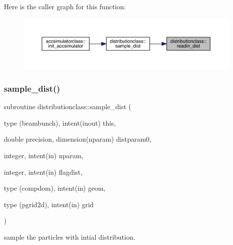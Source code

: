 Here is the caller graph for this function\+:\nopagebreak
\begin{figure}[H]
\begin{center}
\leavevmode
\includegraphics[width=350pt]{namespacedistributionclass_a4efaf82e4273159a0e2651238502bbf2_icgraph}
\end{center}
\end{figure}
\mbox{\label{namespacedistributionclass_a90036cb4aa43f5e3f9844bc412d2a766}} 
\subsubsection{\texorpdfstring{sample\_dist()}{sample\_dist()}}
{\footnotesize\ttfamily subroutine distributionclass\+::sample\+\_\+dist (\begin{DoxyParamCaption}\item[{type (beambunch), intent(inout)}]{this,  }\item[{double precision, dimension(nparam)}]{distparam0,  }\item[{integer, intent(in)}]{nparam,  }\item[{integer, intent(in)}]{flagdist,  }\item[{type (compdom), intent(in)}]{geom,  }\item[{type (pgrid2d), intent(in)}]{grid }\end{DoxyParamCaption})}



sample the particles with intial distribution. 

